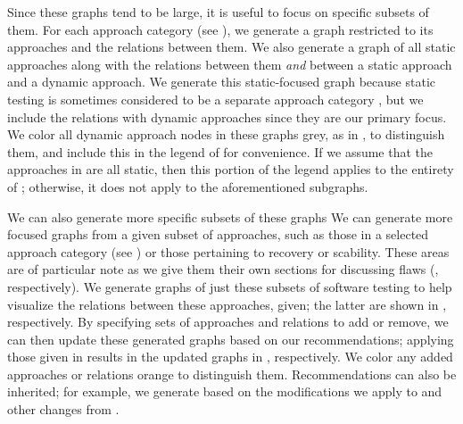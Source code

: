 \fi
Since these graphs tend to be large, it is useful to focus on specific
subsets of them. \ifnotpaper For each approach category (see
    ), we generate a graph restricted to its approaches
    and the relations between them. We also generate a graph of all static
    approaches along with the relations between them \emph{and} between a
    static approach and a dynamic approach. We generate this static-focused
    graph because static testing is sometimes considered to be a separate
    approach category \citep[Fig.~2; see ]{IEEE2022},
    but we include the relations with dynamic approaches since they are our
    primary focus. We color all dynamic approach nodes in these graphs grey,
    as in , to distinguish them, and include this
    in the legend of  for convenience. If we assume
    that the approaches in  are
    all static, then this portion of the legend applies to the entirety of
    ; otherwise, it does not apply to the
    aforementioned subgraphs.

    We can also generate more specific subsets of these graphs
\else We can generate more focused graphs \fi from a given subset of
approaches, such as \ifnotpaper\else those in a selected approach category
    (see ) or \fi those pertaining to recovery or
scability\ifnotpaper. These areas are of particular note as we give them their
own sections for discussing flaws (, respectively).
We generate graphs of just these subsets of software testing to help visualize
the relations between these approaches, given\else; the latter are shown \fi
in , respectively. By
specifying sets of approaches and relations to add or remove, we can then
update these generated graphs based on our recommendations; applying those
given in 
results in the updated graphs in , respectively.
We color any added approaches or relations orange to distinguish them.
\ifnotpaper
    Recommendations can also be inherited; for example, we generate
     based on the modifications we apply to
     and
    other changes from .
\fi

\ifnotpaper
    
\else
    \flawMnfstsTable{}
    \flawDmnsTable{}
\fi
